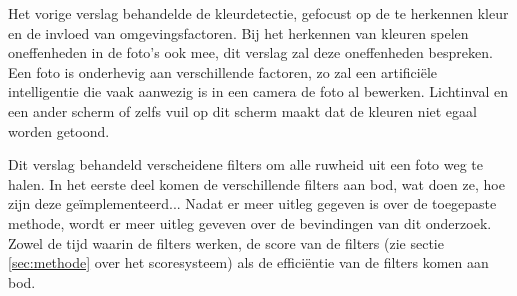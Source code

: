 Het vorige verslag behandelde de kleurdetectie, gefocust op de te herkennen kleur en de invloed van omgevingsfactoren. Bij het herkennen van kleuren spelen oneffenheden in de foto's ook mee, dit verslag zal deze oneffenheden bespreken. Een foto is onderhevig aan verschillende factoren, zo zal een artificiële intelligentie die vaak aanwezig is in een camera de foto al bewerken. Lichtinval en een ander scherm of zelfs vuil op dit scherm maakt dat de kleuren niet egaal worden getoond.

Dit verslag behandeld verscheidene filters om alle ruwheid uit een foto weg te halen. In het eerste deel komen de verschillende filters aan bod, wat doen ze, hoe zijn deze geïmplementeerd... Nadat er meer uitleg gegeven is over de toegepaste methode, wordt er meer uitleg geveven over de bevindingen van dit onderzoek. Zowel de tijd waarin de filters werken, de score van de filters (zie sectie \ref{sec:methode} over het scoresysteem) als de efficiëntie van de filters komen aan bod.